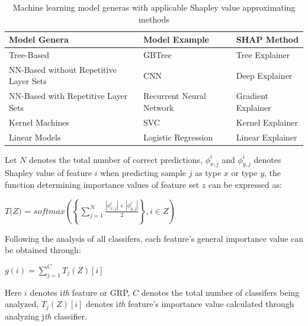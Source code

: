\documentclass[fleqn,10pt]{wlscirep}
\begin{document}
\begin{table}[ht]
\centering
\begin{tabular}{|l|l|l|}
\hline
\textbf{Model Genera} & \textbf{Model Example} & \textbf{SHAP\cite{lundberg2017unified} Method}  \\
\hline
Tree-Based & GBTree & Tree Explainer \\
\hline
NN-Based without Repetitive Layer Sets & CNN & Deep Explainer \\
\hline
NN-Based with Repetitive Layer Sets & Recurrent Neural Network & Gradient Explainer \\
\hline
Kernel Machines & SVC & Kernel Explainer \\
\hline
Linear Models & Logistic Regression & Linear Explainer \\
\hline
\end{tabular}
\caption{\label{shap}Machine learning model generas with applicable Shapley value approximating methods}
\end{table}

Let $N$ denotes the total number of correct predictions, $\phi_{x,j}^{i}$ and $\phi_{y,j}^{i}$ denotes Shapley value of feature $i$ when predicting sample $j$ as type $x$ or type $y$, the function determining importance values of feature set $z$ can be expressed as:

\centerline{$\textit{T(Z) = softmax}(\left\{\sum_{j = 1}^{N}\frac{\left|\phi_{x,j}^{i}\right| + \left|\phi_{y,j}^{i}\right|}{2}\right\}, i \in Z)$}

Following the analysis of all classifers, each feature's general importance value can be obtained through:

\centerline{$g(i) = \sum_{j = 1}^{C}T_{j}(Z)[i]$}

Here $i$ denotes i\emph{th} feature or GRP, $C$ denotes the total number of classifers being analyzed, $T_{j}(Z)[i]$ denotes i\emph{th} feature's importance value calculated through analyzing j\emph{th} classifier.
\end{document}
